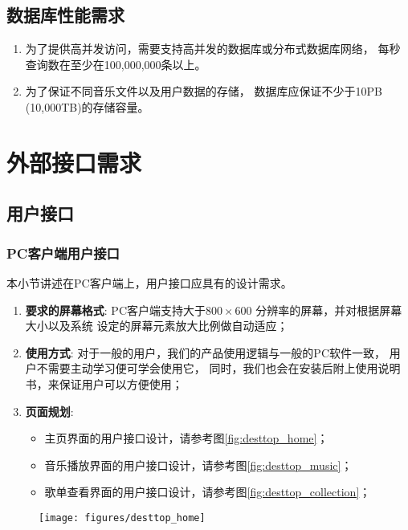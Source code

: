 \begin{enumerate}
\subsection{数据库性能需求}
\begin{enumerate}
	\item 为了提供高并发访问，需要支持高并发的数据库或分布式数据库网络，
		每秒查询数在至少在100,000,000条以上。
	\item 为了保证不同音乐文件以及用户数据的存储，
		数据库应保证不少于10PB (10,000TB)的存储容量。
\end{enumerate}

\section{外部接口需求}
\subsection{用户接口}
\label{ssec:ui}

\subsubsection{PC客户端用户接口} %
本小节讲述在PC客户端上，用户接口应具有的设计需求。

\begin{enumerate}
	\item \textbf{要求的屏幕格式}:
		PC客户端支持大于$800 \times 600$ 分辨率的屏幕，并对根据屏幕大小以及系统
		设定的屏幕元素放大比例做自动适应；
	\item \textbf{使用方式}:
		对于一般的用户，我们的产品使用逻辑与一般的PC软件一致，
			用户不需要主动学习便可学会使用它，
		同时，我们也会在安装后附上使用说明书，来保证用户可以方便使用；
	\item \textbf{页面规划}:  
	\begin{itemize}
		\item 主页界面的用户接口设计，请参考图\ref{fig:desttop_home}；
		\item 音乐播放界面的用户接口设计，请参考图\ref{fig:desttop_music}；
		\item 歌单查看界面的用户接口设计，请参考图\ref{fig:desttop_collection}；
	\end{itemize}
\end{enumerate}

\begin{figure}[h!]
  \centering

  \texttt{[image: figures/desttop\_home]}


\end{figure}
\end{enumerate}
